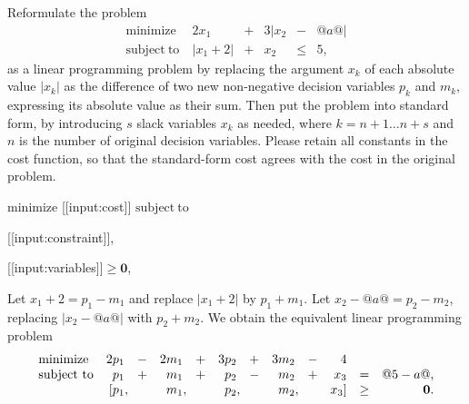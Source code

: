\documentclass[12pt]{article}
\begin{document}
Reformulate the problem
\[
\begin{array}{lrcrcr}
\mathrm{minimize} & 2x_1 &+& 3|x_2 &-& {@a@}| \\
\mathrm{subject\ to\ } & |x_1 + 2| &+& x_2 &\leq& 5,
\end{array}
\]
as a linear programming problem by replacing the argument \(x_k\) of each absolute value \(|x_k|\) as the difference of two new non-negative decision variables \(p_k\) and \(m_k\), expressing its absolute value as their sum. Then
put the problem into standard form, by introducing \(s\) slack variables \(x_k\) as needed, where \(k=n+1\ldots n+s\) and \(n\) is the number of original decision variables. Please retain all constants in the cost function, so that the standard-form cost agrees with the cost in the original problem.


\(\mathrm{minimize}\) [[input:cost]] \(\mathrm{subject\ to}\)


[[input:constraint]],


[[input:variables]]\(\ge\mathbf{0}\),










Let \(x_1+2=p_1-m_1\) and replace \(|x_1+2|\) by \(p_1+m_1\).
Let \(x_2-{@a@}=p_2-m_2\), replacing \(|x_2-{@a@}|\) with
\(p_2+m_2\). We obtain the equivalent linear programming problem
\[
\begin{array}{lrcrcrcrcrcr}
\mathrm{minimize}    &2p_1    &-&2m_1    &+&3p_2    &+&3m_2    &-&4  \\
\mathrm{subject\ to}     &p_1    &+&m_1    &+&p_2    &-&m_2  &+&x_3    &=&{@5-a@},\\
            &[p_1,\kern-2.78pt&&m_1,\kern-2.78pt&&p_2,\kern-2.78pt&&m_2,\kern-2.78pt&&x_3]&\ge& \mathbf{0}.
\end{array}
\]
\end{document}
